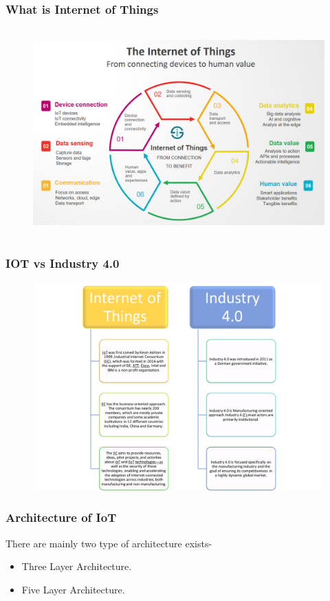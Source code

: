 \documentclass{beamer}
\begin{document}
\begin{frame}
\frametitle{What is Internet of Things}
\begin{figure}
\centering
\includegraphics[width=12cm,height=8cm]{IOT}
\end{figure}

\end{frame}

\begin{frame}
\frametitle{IOT vs Industry 4.0}
\begin{figure}
\centering
\includegraphics[width=12cm,height=8cm]{iotvs}
\end{figure}
\end{frame}

\begin{frame}
\frametitle{Architecture of IoT}
\begin{block}{There are mainly two type of architecture exists-}
\begin{itemize}
	\item Three Layer Architecture.
	\item Five Layer Architecture.
\end{itemize}
\end{block}
\end{frame}
\end{document}
